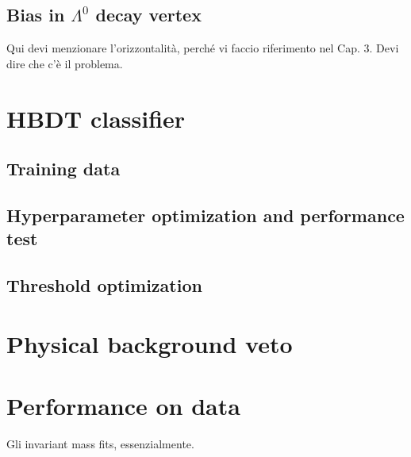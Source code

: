 \subsection{Bias in $\Lambda^0$ decay vertex}
\label{sec:lambda_endvertex_bias}
Qui devi menzionare l'orizzontalità, perché vi faccio riferimento nel Cap. 3. Devi dire che c'è il problema.

\section{HBDT classifier}
\label{sec:HBDT}

\subsection{Training data}

\subsection{Hyperparameter optimization and performance test}

\subsection{Threshold optimization}

\section{Physical background veto}
\label{sec:B0_veto}

\section{Performance on data}
Gli invariant mass fits, essenzialmente.